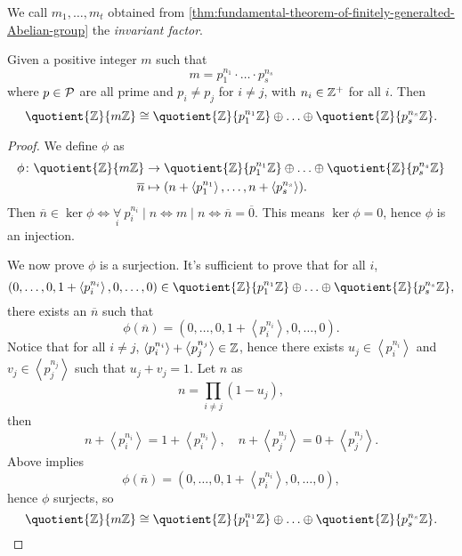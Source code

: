 \begin{definition}\label{def:invariant-factor}
	We call \(m_1, \ldots , m_t \) obtained from \autoref{thm:fundamental-theorem-of-finitely-generalted-Abelian-group} the \emph{invariant factor}.
\end{definition}

\begin{lemma}\label{lma:Chinese-remainder-theorem}
	Given a positive integer \(m\) such that
	\[
		m = p_1^{n_1}\cdot \ldots \cdot p_s^{n_s}
	\]
	where \(p\in \mathcal{\MakeUppercase{p}} \) are all prime and \(p_{i} \neq p_{j} \) for \(i\neq j\), with \(n_{i} \in \mathbb{\MakeUppercase{z}} ^+\) for all \(i\).
	Then
	\[
		\quotient{\mathbb{\MakeUppercase{z}}}{m\mathbb{\MakeUppercase{z}} } \cong \quotient{\mathbb{\MakeUppercase{z}} }{p_1^{n_1}\mathbb{\MakeUppercase{z}} } \oplus \ldots \oplus \quotient{\mathbb{\MakeUppercase{z}} }{p_s^{n_s}\mathbb{\MakeUppercase{z}} }.
	\]
\end{lemma}
\begin{proof}
	We define \(\phi\) as
	\[
		\begin{split}
			\phi \colon \quotient{\mathbb{\MakeUppercase{z}} }{m\mathbb{\MakeUppercase{z}} } &\to \quotient{\mathbb{\MakeUppercase{z}} }{p_1^{n_1}\mathbb{\MakeUppercase{z}} } \oplus \ldots \oplus \quotient{\mathbb{\MakeUppercase{z}} }{p_s^{n_s}\mathbb{\MakeUppercase{z}} }\\
			\overline{n} &\mapsto (n + \left< p_1^{n_1} \right>, \ldots , n + \left< p_s^{n_s} \right>  ).
		\end{split}
	\]
	Then \(\overline{n} \in \ker  \phi \iff \underset{i}{\forall }\ p_i^{n_{i} }\mid n \iff m\mid n \iff \overline{n} = \overline{0}\). This means \(\ker  \phi = 0\), hence \(\phi \) is an injection.

	We now prove \(\phi \) is a surjection. It's sufficient to prove that for all \(i\),
	\[
		(0, \ldots , 0, 1+ \left< p_i ^{n_{i} } \right>, 0, \ldots , 0)\in \quotient{\mathbb{\MakeUppercase{z}} }{p_1^{n_1}\mathbb{\MakeUppercase{z}} } \oplus \ldots \oplus \quotient{\mathbb{\MakeUppercase{z}} }{p_{s} ^{n_{s} }\mathbb{\MakeUppercase{z}} },
	\]
	there exists an \(\overline{n} \) such that
	\[
		\phi (\overline{n} ) = (0, \ldots , 0, 1+\left< p_{i} ^{n_{i}}\right>, 0, \ldots , 0).
	\]
	Notice that for all \(i\neq j\), \(\left< p_{i} ^{n_{i} } \right> + \left< p_{j} ^{n_{j} } \right> \in \mathbb{\MakeUppercase{z}}  \), hence there exists \(u_{j} \in \left< p_{i} ^{n_{i} } \right> \) and
	\(v_{j} \in \left< p_{j} ^{n_{j} } \right> \) such that \(u_{j} + v_{j} = 1\). Let \(n\) as
	\[
		n = \prod\limits_{i\neq j}(1 - u_{j} ),
	\]
	then
	\[
		n + \left< p_{i} ^{n_{i} } \right> = 1 + \left<  p_{i} ^{n_{i} }\right>,\quad n + \left< p_{j} ^{n_{j} } \right> = 0 + \left< p_{j} ^{n_{j} } \right>.
	\]
	Above implies
	\[
		\phi (\overline{n} ) = (0, \ldots , 0, 1 + \left< p_{i} ^{n_{i} } \right> , 0, \ldots , 0),
	\]
	hence \(\phi \) surjects, so
	\[
		\quotient{\mathbb{\MakeUppercase{z}}}{m\mathbb{\MakeUppercase{z}} } \cong \quotient{\mathbb{\MakeUppercase{z}} }{p_1^{n_1}\mathbb{\MakeUppercase{z}} } \oplus \ldots \oplus \quotient{\mathbb{\MakeUppercase{z}} }{p_s^{n_s}\mathbb{\MakeUppercase{z}} }.
	\]
\end{proof}

